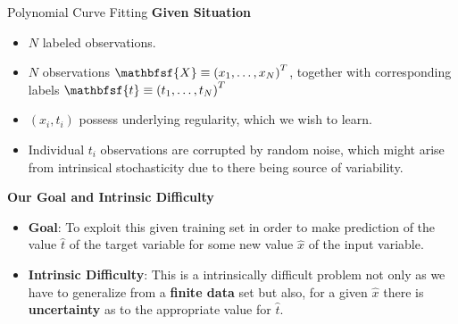 \documentclass{bredelebeamer}
\begin{document}
\begin{frame}{Polynomial Curve Fitting}
  \textbf{Given Situation}
  \begin{itemize}
    \item $N$ labeled observations.

  \end{itemize}
  \begin{itemize}
    \item\begin{justify}
      $N$ observations $\mathbfsf{X} \equiv {(x_1,\ldots,x_N)}^{T}$, together
      with corresponding labels $\mathbfsf{t} \equiv {(t_1,\ldots,t_N)}^{T}$
    \end{justify}
    \item\begin{justify}
      $(\mathit{x}_i, \mathit{t}_i)$ possess underlying regularity, which
      we wish to learn.
    \end{justify}
    \item\begin{justify}
      Individual $\mathit{t}_i$ observations are corrupted by random noise,
      which might arise from intrinsical stochasticity due to there being
      source of variability.
    \end{justify}
  \end{itemize}

  \textbf{Our Goal and Intrinsic Difficulty}
  \begin{itemize}
    \item\begin{justify}
      \textbf{Goal}: To exploit this given training set in order to make
      prediction of the value $\hat{t}$ of the target variable for some new
      value $\hat{x}$ of the input variable.
    \end{justify}
    \item\begin{justify}
      \textbf{Intrinsic Difficulty}: This is a intrinsically difficult problem
      not only as we have to generalize from a \textbf{finite data} set but also,
      for a given $\hat{x}$ there is \textbf{uncertainty} as to the appropriate
      value for $\hat{t}$.
    \end{justify}
  \end{itemize}
\end{frame}
\end{document}
